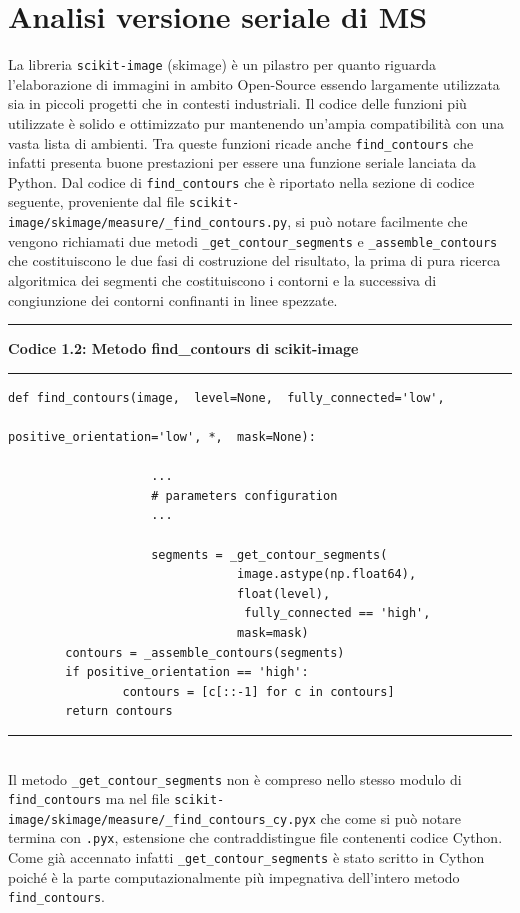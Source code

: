 \documentclass[12pt,a4paper]{report}
\begin{document}
\section{Analisi versione seriale di MS}
La libreria \verb|scikit-image| (skimage) è un pilastro per quanto riguarda l'elaborazione di immagini in ambito Open-Source essendo largamente utilizzata sia in piccoli progetti che in contesti industriali.  Il codice delle funzioni più utilizzate è solido e ottimizzato pur mantenendo un'ampia compatibilità con una vasta lista di ambienti. 
Tra queste funzioni ricade anche \verb|find_contours| che infatti presenta buone prestazioni per essere una funzione seriale lanciata da Python.\newline
Dal codice di \verb|find_contours| che è riportato nella sezione di codice seguente, proveniente dal file \verb|scikit-image/skimage/measure/_find_contours.py|, si può notare facilmente che vengono richiamati due metodi \verb|_get_contour_segments| e \verb|_assemble_contours| che costituiscono le due fasi di costruzione del risultato, la prima di pura ricerca algoritmica dei segmenti che costituiscono i contorni e la successiva di congiunzione dei contorni confinanti in linee spezzate. \\[10pt]
\noindent\rule[0.5ex]{\linewidth}{2pt}
\small{\textbf{Codice 1.2: Metodo find\_contours di scikit-image}} \\
\noindent\rule[0.5ex]{\linewidth}{1pt}
\begin{lstlisting}
def find_contours(image,  level=None,  fully_connected='low', 
																		positive_orientation='low', *,  mask=None):

					...
					# parameters configuration
					...	

					segments = _get_contour_segments(
					 			image.astype(np.float64), 
					 			float(level),
								 fully_connected == 'high', 
					 			mask=mask)
    	contours = _assemble_contours(segments)
    	if positive_orientation == 'high':
        		contours = [c[::-1] for c in contours]
    	return contours
\end{lstlisting}
\noindent\rule[0.5ex]{\linewidth}{1pt} \\[10pt]
Il metodo \verb|_get_contour_segments| non è compreso nello stesso modulo di \verb|find_contours| ma nel file \verb|scikit-image/skimage/measure/_find_contours_cy.pyx| che come si può notare termina con \verb|.pyx|, estensione che contraddistingue file contenenti codice Cython.  Come già accennato infatti \verb|_get_contour_segments| è stato scritto in Cython poiché è la parte computazionalmente più impegnativa dell'intero metodo \verb|find_contours|.  \newline
\end{document}
